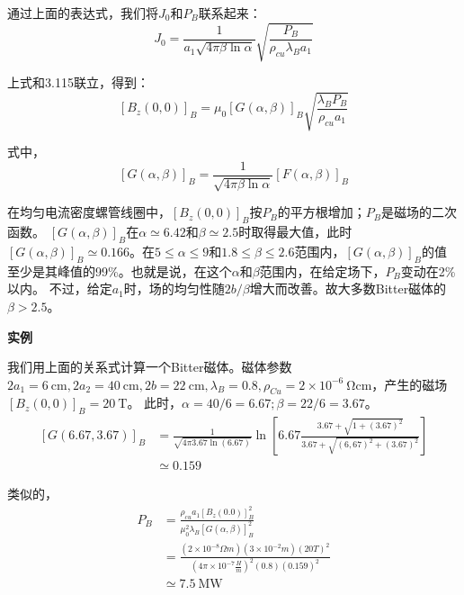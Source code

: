 通过上面的表达式，我们将$J_0$和$P_B$联系起来：
\begin{equation}
J_0=\frac{1}{a_1\sqrt{4\pi\beta\ln\alpha}}\sqrt{\frac{P_B}{\rho_{cu}\lambda_B a_1}}%
\end{equation}

上式和3.115联立，得到：
\begin{equation}
{[B_z(0,0)]}_B=\mu_0[G(\alpha,\beta)]_B\sqrt{\frac{\lambda_B P_B}{\rho_{cu}a_1}}%
\end{equation}

式中，
\begin{equation}
{[G(\alpha,\beta)]}_B=\frac{1}{\sqrt{4\pi\beta\ln\alpha}}[F(\alpha,\beta)]_B%
\end{equation}

在均匀电流密度螺管线圈中，$[B_z(0,0)]_B$按$P_B$的平方根增加；$P_B$是磁场的二次函数。
$[G(\alpha,\beta)]_B$在$\alpha\simeq 6.42$和$\beta\simeq 2.5$时取得最大值，此时$[G(\alpha,\beta)]_B\simeq 0.166$。在$5\leq \alpha \leq 9$和$1.8\leq\beta\leq 2.6$范围内，$[G(\alpha,\beta)]_B$的值
至少是其峰值的99\%。也就是说，在这个$\alpha$和$\beta$范围内，在给定场下，$P_B$变动在2\%以内。
不过，给定$a_1$时，场的均匀性随$2b/\beta$增大而改善。故大多数Bitter磁体的$\beta>2.5$。

\textbf{实例}

我们用上面的关系式计算一个Bitter磁体。磁体参数$2a_1=6\ \mathrm{cm}, 2a_2=40\ \mathrm{cm}, 2b=22 \ \mathrm{cm},\lambda_B=0.8, \rho_{Cu}=2\times10^{-6}\ \mathrm{\Omega cm}$，产生的磁场$[B_z(0,0)]_B=20\ \mathrm{T}$。
此时，$\alpha=40/6=6.67;\beta=22/6=3.67$。
\begin{equation}
\begin{split}
{[G(6.67,3.67)]}_B&=\frac{1}{\sqrt{4\pi3.67\ln(6.67)}}\ln\left[6.67\frac{3.67+\sqrt{1+(3.67)^2}}{3.67+\sqrt{(6,67)^2+(3.67)^2}}\right]\\
&\simeq 0.159 %
\end{split}
\end{equation}

类似的，
\begin{equation}
\begin{split}
P_B&=\frac{\rho_{cu}a_1[B_z(0.0)]_B^2}{\mu_0^2\lambda_B[G(\alpha,\beta)]_B^2}\\
&=\frac{(2\times 10^{-8}\Omega m)(3\times 10^{-2}m)(20T)^2}{(4\pi\times 10^{-7}\frac{H}{m})^2(0.8)(0.159)^2}\\
&\simeq 7.5\ \mathrm{MW}%
\end{split}
\end{equation}

